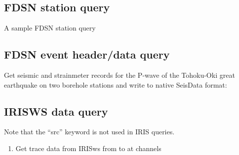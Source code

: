 \documentclass[letterpaper,11pt,english]{sphinxmanual}
\begin{document}
\subsection{FDSN station query}
\label{\detokenize{src/Appendices/examples:fdsn-station-query}}
A sample FDSN station query

\begin{sphinxVerbatim}[commandchars=\\\{\}]
  
\end{sphinxVerbatim}


\subsection{FDSN event header/data query}
\label{\detokenize{src/Appendices/examples:fdsn-event-header-data-query}}
Get seismic and strainmeter records for the P-wave of the Tohoku-Oki great earthquake on two borehole stations and write to native SeisData format:

\begin{sphinxVerbatim}[commandchars=\\\{\}]
   
 
\end{sphinxVerbatim}


\subsection{IRISWS data query}
\label{\detokenize{src/Appendices/examples:irisws-data-query}}
Note that the “src” keyword is not used in IRIS queries.
\begin{enumerate}
\def\theenumi{\arabic{enumi}}
\def\labelenumi{\theenumi .}
\makeatletter\def\p@enumii{\p@enumi \theenumi .}\makeatother
\item {} 
Get trace data from IRISws from  to  at channels 

\end{enumerate}
\end{document}
